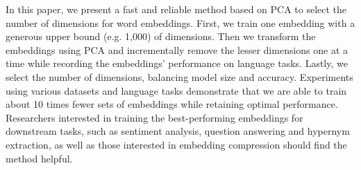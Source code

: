 In this paper, we present a fast and reliable method based on PCA to select the number of dimensions for word embeddings. First, we train one embedding with a generous upper bound (e.g. 1,000) of dimensions. Then we transform the embeddings using PCA and incrementally remove the lesser dimensions one at a time while recording the embeddings' performance on language tasks. Lastly, we select the number of dimensions, balancing model size and accuracy. Experiments using various datasets and language tasks demonstrate that we are able to train about 10 times fewer sets of embeddings while retaining optimal performance. Researchers interested in training the best-performing embeddings for downstream tasks, such as sentiment analysis, question answering and hypernym extraction, as well as those interested in embedding compression should find the method helpful.
